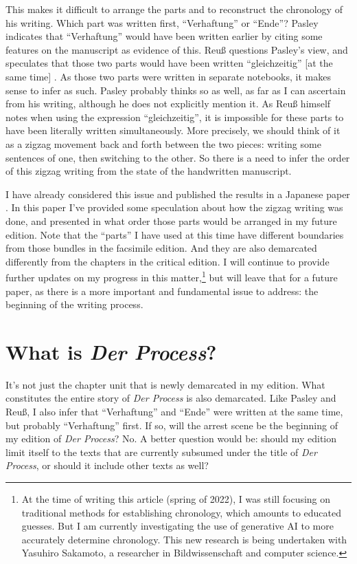 \begin{paper}
This makes it difficult to arrange the parts and to reconstruct the
chronology of his writing. Which part was written first, ``Verhaftung'' or ``Ende''?
Pasley indicates that ``Verhaftung'' would have been written earlier by citing some features on the manuscript as evidence of this. Reuß
questions Pasley's view, and speculates that those two parts would have
been written ``gleichzeitig'' {[}at the same time{]} \citep[6]{kafka_zur_1997}.
As those two parts were written in separate notebooks, it makes sense to
infer as such. Pasley probably thinks so as well, as far as I can ascertain
from his writing, although he does not explicitly mention it. As Reuß
himself notes when using the expression ``gleichzeitig'', it is
impossible for these parts to have been literally written
simultaneously. More precisely, we should think of it as a zigzag
movement back and forth between the two pieces: writing some sentences
of one, then switching to the other. So there is a need to infer the
order of this zigzag writing from the state of the handwritten
manuscript.

I have already considered this issue and published the results in a
Japanese paper \citep[see][]{myojo_taiho_2021}. In this paper I've provided some
speculation about how the zigzag writing was done, and presented in what
order those parts would be arranged in my future edition. Note that the
``parts'' I have used at this time have different boundaries from those
bundles in the facsimile edition. And they are also demarcated
differently from the chapters in the critical edition. I will continue
to provide further updates on my progress in this matter,\footnote{\label{myojo:fn:ai}At the time of writing this article (spring of 2022), I was still focusing on traditional methods for establishing chronology, which amounts to educated guesses. But I am currently investigating the use of generative AI to more accurately determine chronology. This new research is being undertaken with Yasuhiro Sakamoto, a researcher in Bildwissenschaft and computer science.} but will leave
that for a future paper, as there is a more important and fundamental
issue to address: the beginning of the writing process.

\section{ What is \emph{Der
Process}?}\label{what-is-der-process}

It's not just the chapter unit that is newly demarcated in my edition.
What constitutes the entire story of \emph{Der Process} is also
demarcated. Like Pasley and Reuß, I also infer that ``Verhaftung'' and
``Ende'' were written at the same time, but probably ``Verhaftung''
first. If so, will the arrest scene be the beginning of my edition of
\emph{Der Process}? No. A better question would be: should my
edition limit itself to the texts that are currently subsumed under the
title of \emph{Der Process}, or should it include other texts as well?


\end{paper}
